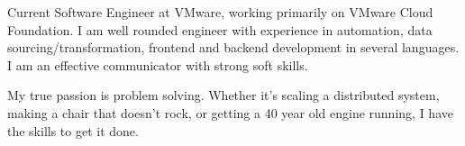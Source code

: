 

\begin{cvparagraph}

Current Software Engineer at VMware, working primarily on VMware Cloud Foundation. I am well rounded engineer with experience in automation, data sourcing/transformation, frontend and backend development in several languages. I am an effective communicator with strong soft skills. 

My true passion is problem solving. Whether it's scaling a distributed system, making a chair that doesn't rock, or getting a 40 year old engine running, I have the skills to get it done.  
\end{cvparagraph}
